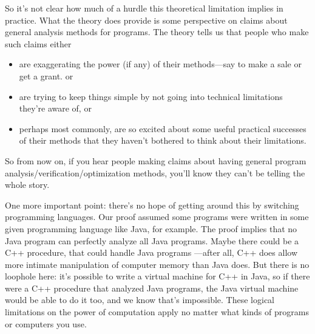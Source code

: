   So it's not clear how much of a hurdle this theoretical limitation
  implies in practice.  What the theory does provide is some perspective
  on claims about general analysis methods for programs.  The theory tells
  us that people who make such claims either

\begin{itemize}
\item are exaggerating the power (if any) of their methods---say to make a
  sale or get a grant. or

\item are trying to keep things simple by not going into technical
  limitations they're aware of, or

\item perhaps most commonly, are so excited about some useful practical
    successes of their methods that they haven't bothered to think about
    their limitations.
\end{itemize}

So from now on, if you hear people making claims about having general
program analysis/verification/optimization methods, you'll know they can't
be telling the whole story.

One more important point: there's no hope of getting around this by
switching programming languages.  Our proof assumed some programs were
written in some given programming language like Java, for example.  The
proof implies that no Java program can perfectly analyze all Java
programs.  Maybe there could be a C++ procedure, that could handle Java
programs ---after all, C++ does allow more intimate manipulation of
computer memory than Java does.  But there is no loophole here: it's
possible to write a virtual machine for C++ in Java, so if there were a
C++ procedure that analyzed Java programs, the Java virtual machine would
be able to do it too, and we know that's impossible.  These logical
limitations on the power of computation apply no matter what kinds of
programs or computers you use.

